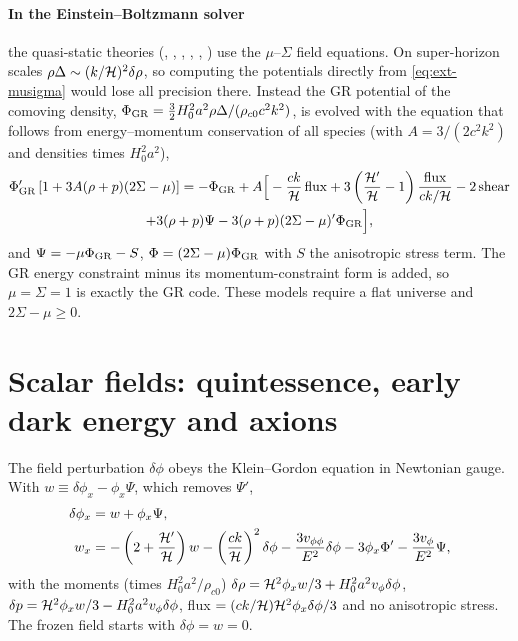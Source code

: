 \paragraph*{In the Einstein--Boltzmann solver} the quasi-static theories (, , ,
, , ) use the $\mu$--$\Sigma$ field equations. On super-horizon scales
$\rho\Delta\sim(k/\mathcal{H})^2\delta\rho$, so computing the potentials directly from \cref{eq:ext-musigma} would lose all
precision there. Instead the GR potential of the comoving density, $\Phi_{\rm GR}=\frac32H_0^2a^2\rho\Delta/
(\rho_{c0}c^2k^2)$, is evolved with the equation that follows from energy--momentum conservation of all species
(with $A=3/(2c^2k^2)$ and densities times $H_0^2a^2$),
\begin{multline}
\Phi_{\rm GR}'\left[1+3A(\rho+p)(2\Sigma-\mu)\right]=-\Phi_{\rm GR}+A\Big[-\frac{ck}{\mathcal{H}}\,{\rm flux}
+3\left(\frac{\mathcal{H}'}{\mathcal{H}}-1\right)\frac{\rm flux}{ck/\mathcal{H}}-2\,{\rm shear}\\+3(\rho+p)\Psi-3(\rho+p)(2\Sigma-\mu)'\Phi_{\rm GR}\Big],
\end{multline}
and $\Psi=-\mu\Phi_{\rm GR}-S$, $\Phi=(2\Sigma-\mu)\Phi_{\rm GR}$ with $S$ the anisotropic stress term. The GR energy
constraint minus its momentum-constraint form is added, so $\mu=\Sigma=1$ is exactly the GR code. These models require
a flat universe and $2\Sigma-\mu\ge0$.

\section{Scalar fields: quintessence, early dark energy and axions}\label{sec:ext-scalar}

The field perturbation $\delta\phi$ obeys the Klein--Gordon equation in Newtonian gauge. With
$w\equiv\delta\phi_x-\phi_x\Psi$, which removes $\Psi'$,
\begin{align}
\delta\phi_x&=w+\phi_x\Psi,\\
w_x&=-\left(2+\frac{\mathcal{H}'}{\mathcal{H}}\right)w-\left(\frac{ck}{\mathcal{H}}\right)^2\delta\phi-\frac{3v_{\phi\phi}}{E^2}\delta\phi
-3\phi_x\Phi'-\frac{3v_\phi}{E^2}\Psi,
\end{align}
with the moments (times $H_0^2a^2/\rho_{c0}$) $\delta\rho=\mathcal{H}^2\phi_xw/3+H_0^2a^2v_\phi\delta\phi$,
$\delta p=\mathcal{H}^2\phi_xw/3-H_0^2a^2v_\phi\delta\phi$, flux $=(ck/\mathcal{H})\mathcal{H}^2\phi_x\delta\phi/3$ and no anisotropic stress.
The frozen field starts with $\delta\phi=w=0$.

